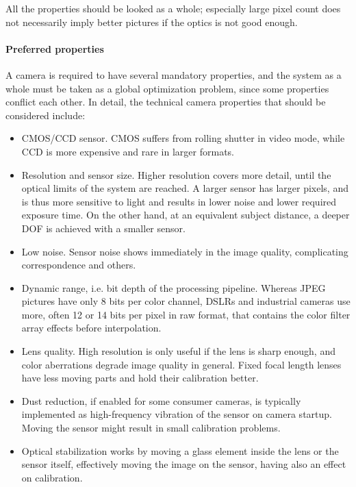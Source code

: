 All the properties should be looked as a whole; especially large pixel count does not necessarily imply better pictures if the optics is not good enough.



\paragraph{Preferred properties}
A camera is required to have several mandatory properties, and the system as a whole must be taken as a global optimization problem, since some properties conflict each other.
In detail, the technical camera properties that should be considered include:

\begin{itemize}
	\item CMOS/CCD sensor. CMOS suffers from rolling shutter in video mode, while CCD is more expensive and rare in larger formats.

	\item Resolution and sensor size. Higher resolution covers more detail, until the optical limits of the system are reached. A larger sensor has larger pixels, and is thus more sensitive to light and results in lower noise and lower required exposure time. On the other hand, at an equivalent subject distance, a deeper DOF is achieved with a smaller sensor.

	\item Low noise. Sensor noise shows immediately in the image quality, complicating correspondence and others.

	\item Dynamic range, i.e. bit depth of the processing pipeline. Whereas JPEG pictures have only 8 bits per color channel, DSLRs and industrial cameras use more, often 12 or 14 bits per pixel in raw format, that contains the color filter array effects before interpolation.

	\item Lens quality. High resolution is only useful if the lens is sharp enough, and color aberrations degrade image quality in general. Fixed focal length lenses have less moving parts and hold their calibration better.

	\item Dust reduction, if enabled for some consumer cameras, is typically implemented as high-frequency vibration of the sensor on camera startup. Moving the sensor might result in small calibration problems.

	\item Optical stabilization works by moving a glass element inside the lens or the sensor itself, effectively moving the image on the sensor, having also an effect on calibration.


\end{itemize}
